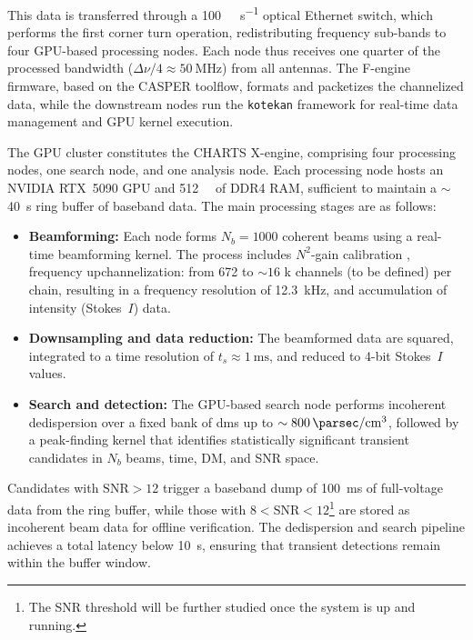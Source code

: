 This data is transferred through a \SI{100}{\giga\bit\per\second} optical Ethernet switch, which performs the first corner turn operation, redistributing frequency sub-bands to four GPU-based processing nodes. Each node thus receives one quarter of the processed bandwidth (\(\Delta\nu/4 \approx \SI{50}{\mega\hertz}\)) from all antennas. The F-engine firmware, based on the CASPER toolflow, formats and packetizes the channelized data, while the downstream nodes run the \texttt{kotekan} framework \citep{kotekan} for real-time data management and GPU kernel execution.

The GPU cluster constitutes the CHARTS X-engine, comprising four processing nodes, one search node, and one analysis node. Each processing node hosts an NVIDIA RTX~5090 GPU and \SI{512}{\giga\byte} of DDR4 RAM, sufficient to maintain a $\sim$\SI{40}{\second} ring buffer of baseband data. The main processing stages are as follows:
\begin{itemize}
    \item \textbf{Beamforming:} Each node forms $N_b = 1000$ coherent beams using a real-time beamforming kernel. The process includes $N^2$-gain calibration \citep{Newburgh_2014}, frequency upchannelization: from \num{672} to $\sim \num{16}$ k channels (to be defined) per chain, resulting in a frequency resolution of \SI{12.3}{\kilo\hertz}, and accumulation of intensity (Stokes~$I$) data.
    \item \textbf{Downsampling and data reduction:} The beamformed data are squared, integrated to a time resolution of $t_s \approx \SI{1}{\milli\second}$, and reduced to 4-bit Stokes~$I$ values.
    \item \textbf{Search and detection:} The GPU-based search node performs incoherent dedispersion over a fixed bank of \glspl{dm} up to $\sim\SI{800}{\parsec\per\centi\meter^3}$, followed by a peak-finding kernel that identifies statistically significant transient candidates in $N_b$ beams, time, DM, and SNR space.
\end{itemize}

Candidates with $\text{SNR}>12$ trigger a baseband dump of \SI{100}{\milli\second} of full-voltage data from the ring buffer, while those with $8<\text{SNR}<12$\footnote{The SNR threshold will be further studied once the system is up and running.} are stored as incoherent beam data for offline verification. The dedispersion and search pipeline achieves a total latency below \SI{10}{\second}, ensuring that transient detections remain within the buffer window.

